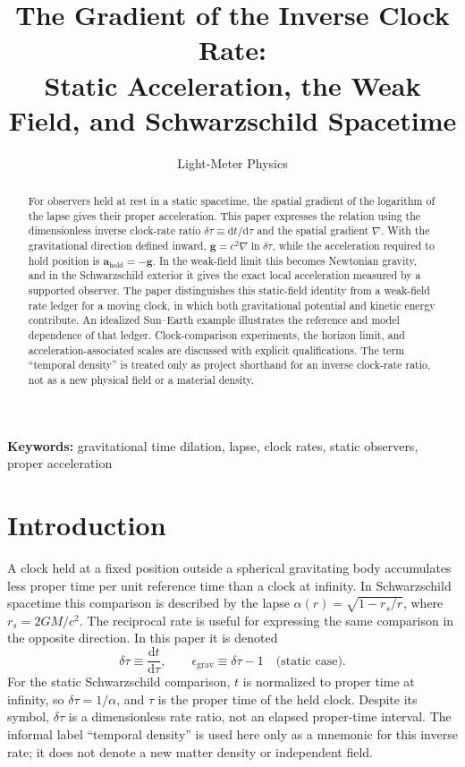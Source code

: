 \documentclass[12pt]{article}
\title{The Gradient of the Inverse Clock Rate:\\
Static Acceleration, the Weak Field, and Schwarzschild Spacetime}
\author{Light-Meter Physics}
\date{}
\begin{document}
\maketitle

\begin{abstract}
For observers held at rest in a static spacetime, the spatial gradient of the logarithm of the lapse gives their proper acceleration. This paper expresses the relation using the dimensionless inverse clock-rate ratio $\delta\tau\equiv\mathrm{d}t/\mathrm{d}\tau$ and the spatial gradient $\nabla$. With the gravitational direction defined inward, $\mathbf{g}=c^2\nabla\ln\delta\tau$, while the acceleration required to hold position is $\mathbf{a}_{\mathrm{hold}}=-\mathbf{g}$. In the weak-field limit this becomes Newtonian gravity, and in the Schwarzschild exterior it gives the exact local acceleration measured by a supported observer. The paper distinguishes this static-field identity from a weak-field rate ledger for a moving clock, in which both gravitational potential and kinetic energy contribute. An idealized Sun--Earth example illustrates the reference and model dependence of that ledger. Clock-comparison experiments, the horizon limit, and acceleration-associated scales are discussed with explicit qualifications. The term ``temporal density'' is treated only as project shorthand for an inverse clock-rate ratio, not as a new physical field or a material density.
\end{abstract}

\noindent\textbf{Keywords:} gravitational time dilation, lapse, clock rates, static observers, proper acceleration

\section{Introduction}

A clock held at a fixed position outside a spherical gravitating body accumulates less proper time per unit reference time than a clock at infinity. In Schwarzschild spacetime this comparison is described by the lapse $\alpha(r)=\sqrt{1-r_s/r}$, where $r_s=2GM/c^2$. The reciprocal rate is useful for expressing the same comparison in the opposite direction. In this paper it is denoted
\begin{equation}
  \delta\tau\equiv\frac{\mathrm{d}t}{\mathrm{d}\tau},
  \qquad
  \epsilon_{\mathrm{grav}}\equiv\delta\tau-1\quad\text{(static case)}.
  \label{eq:inverse-rate}
\end{equation}
For the static Schwarzschild comparison, $t$ is normalized to proper time at infinity, so $\delta\tau=1/\alpha$, and $\tau$ is the proper time of the held clock. Despite its symbol, $\delta\tau$ is a dimensionless rate ratio, not an elapsed proper-time interval. The informal label ``temporal density'' is used here only as a mnemonic for this inverse rate; it does not denote a new matter density or independent field.
\end{document}
